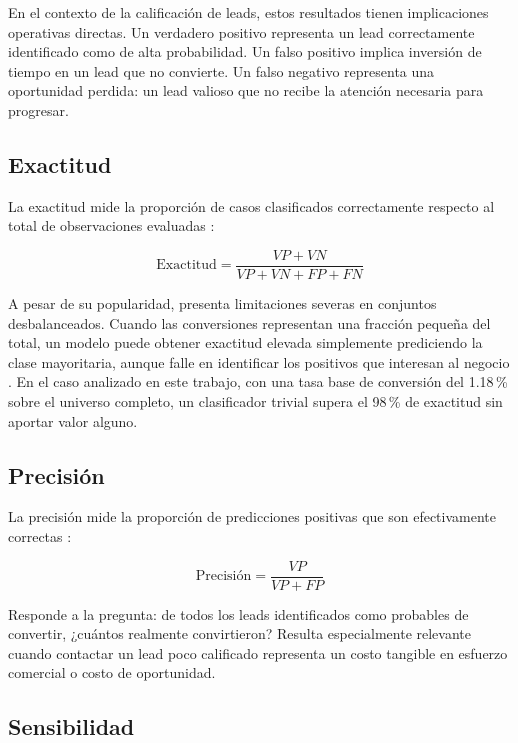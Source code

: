 En el contexto de la calificación de leads, estos resultados tienen implicaciones
operativas directas. Un verdadero positivo representa un lead correctamente
identificado como de alta probabilidad. Un falso positivo implica inversión de
tiempo en un lead que no convierte. Un falso negativo representa una oportunidad
perdida: un lead valioso que no recibe la atención necesaria para progresar.

\subsection{Exactitud}

La exactitud mide la proporción de casos clasificados correctamente respecto al
total de observaciones evaluadas \cite{han2011data}:

\begin{equation}
\text{Exactitud} = \frac{VP + VN}{VP + VN + FP + FN}
\end{equation}

A pesar de su popularidad, presenta limitaciones severas en conjuntos
desbalanceados. Cuando las conversiones representan una fracción pequeña del total,
un modelo puede obtener exactitud elevada simplemente prediciendo la clase
mayoritaria, aunque falle en identificar los positivos que interesan al negocio
\cite{provost2013data}. En el caso analizado en este trabajo, con una tasa base de
conversión del 1.18\,\% sobre el universo completo, un clasificador trivial supera
el 98\,\% de exactitud sin aportar valor alguno.

\subsection{Precisión}

La precisión mide la proporción de predicciones positivas que son efectivamente
correctas \cite{kuhn2013applied}:

\begin{equation}
\text{Precisión} = \frac{VP}{VP + FP}
\end{equation}

Responde a la pregunta: de todos los leads identificados como probables de
convertir, ¿cuántos realmente convirtieron? Resulta especialmente relevante cuando
contactar un lead poco calificado representa un costo tangible en esfuerzo
comercial o costo de oportunidad.

\subsection{Sensibilidad}

